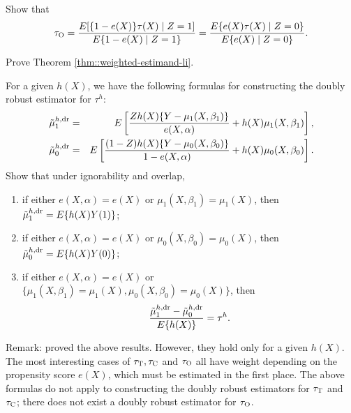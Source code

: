 \begin{HomeworkProblem}\label{exr:13-8}

Show that
\[
\tau_\textsc{O}
=  \frac{   E  [   \{1-e(X)\} \tau(X) \mid Z=1   ]      }{  E  \{ 1-e(X) \mid Z=1   \}   }
=  \frac{   E  \{ e(X) \tau(X) \mid Z=0   \}      }{  E  \{ e(X) \mid Z=0   \}   }.
\]



\end{HomeworkProblem}

\begin{HomeworkProblem}\label{exr:13-9}

Prove Theorem \ref{thm::weighted-estimand-li}.


\end{HomeworkProblem}

\begin{HomeworkProblem}\label{exr:13-10}


For a given $h(X)$, we have the following formulas for constructing the doubly robust estimator for $\tau^h$:
\begin{eqnarray*}
\tilde{\mu}_1^{h,\textup{dr}} &=& E\left[   \frac{Zh(X)  \{ Y-\mu_1(X,\beta_1)   \}}{  e(X,\alpha) }   + h(X) \mu_1(X, \beta_1)  \right] ,  \\
\tilde{\mu}_0^{h, \textup{dr}} &=& E\left[   \frac{(1-Z) h(X)  \{ Y-\mu_0(X,\beta_0) \}}{  1-e(X,\alpha) }   + h(X) \mu_0(X, \beta_0)  \right]  .
\end{eqnarray*}
Show that under ignorability and overlap,
\begin{enumerate}
\item
if either $e(X,\alpha) = e(X)$ or $\mu_1(X, \beta_1) = \mu_1(X)$, then $\tilde{\mu}_1^{h,\textup{dr}}= E\{  h(X)  Y(1) \}$;
\item
if either $e(X,\alpha) = e(X)$ or $\mu_0(X, \beta_0) = \mu_0(X)$, then $\tilde{\mu}_0^{h, \textup{dr}}= E\{ h(X)  Y(0) \}$;
\item
if either $e(X,\alpha) = e(X)$ or $\{\mu_1(X, \beta_1) = \mu_1(X),   \mu_0(X, \beta_0) = \mu_0(X)\}$, then
\[
\frac{\tilde{\mu}_1^{h,\textup{dr}}  -\tilde{\mu}_0^{h, \textup{dr}}  }{  E\{ h(X)  \}  }
= \tau^h .
\]
\end{enumerate}

Remark:
\citet{tao2019doubly} proved the above results. However, they hold only for a  given $h(X)$. The most interesting cases of $\tau_\textsc{T}, \tau_\textsc{C}$ and $\tau_\textsc{O}$ all have weight depending on the propensity score $e(X)$, which must be estimated in the first place. The above formulas do not apply to constructing the doubly robust estimators for $\tau_\textsc{T}$ and $\tau_\textsc{C}$; there does not exist a doubly robust estimator for $\tau_\textsc{O}$.


\end{HomeworkProblem}

